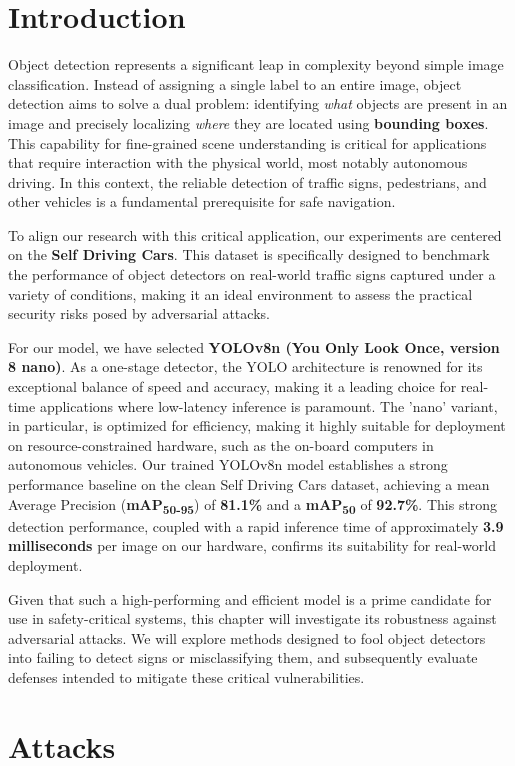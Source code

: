 \documentclass[../main.tex]{subfiles}
\begin{document}
\section{Introduction}
\label{sec:detection_intro}
Object detection represents a significant leap in complexity beyond simple image classification. Instead of assigning a single label to an entire image, object detection aims to solve a dual problem: identifying \textit{what} objects are present in an image and precisely localizing \textit{where} they are located using \textbf{bounding boxes}. This capability for fine-grained scene understanding is critical for applications that require interaction with the physical world, most notably autonomous driving. In this context, the reliable detection of traffic signs, pedestrians, and other vehicles is a fundamental prerequisite for safe navigation.

To align our research with this critical application, our experiments are centered on the \textbf{Self Driving Cars}. This dataset is specifically designed to benchmark the performance of object detectors on real-world traffic signs captured under a variety of conditions, making it an ideal environment to assess the practical security risks posed by adversarial attacks.

For our model, we have selected \textbf{YOLOv8n (You Only Look Once, version 8 nano)}. As a one-stage detector, the YOLO architecture is renowned for its exceptional balance of speed and accuracy, making it a leading choice for real-time applications where low-latency inference is paramount. The 'nano' variant, in particular, is optimized for efficiency, making it highly suitable for deployment on resource-constrained hardware, such as the on-board computers in autonomous vehicles. Our trained YOLOv8n model establishes a strong performance baseline on the clean Self Driving Cars dataset, achieving a mean Average Precision (\textbf{mAP\textsubscript{50-95}}) of \textbf{81.1\%} and a \textbf{mAP\textsubscript{50}} of \textbf{92.7\%}. This strong detection performance, coupled with a rapid inference time of approximately \textbf{3.9 milliseconds} per image on our hardware, confirms its suitability for real-world deployment.

Given that such a high-performing and efficient model is a prime candidate for use in safety-critical systems, this chapter will investigate its robustness against adversarial attacks. We will explore methods designed to fool object detectors into failing to detect signs or misclassifying them, and subsequently evaluate defenses intended to mitigate these critical vulnerabilities.\section{Attacks}
\end{document}
